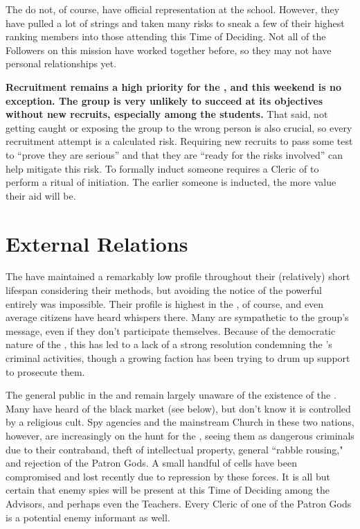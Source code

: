 \documentclass[blue]{GL2020}
\begin{document}
The \pGoaties{} do not, of course, have official representation at the school. However, they have pulled a lot of strings and taken many risks to sneak a few of their highest ranking members into those attending this Time of Deciding. Not all of the Followers on this mission have worked together before, so they may not have personal relationships yet.

\textbf{Recruitment remains a high priority for the \pGoaties{}, and this weekend is no exception. The group is very unlikely to succeed at its objectives without new recruits, especially among the students.} That said, not getting caught or exposing the group to the wrong person is also crucial, so every recruitment attempt is a calculated risk. Requiring new recruits to pass some test to ``prove they are serious'' and that they are ``ready for the risks involved'' can help mitigate this risk. To formally induct someone requires a Cleric of \cGenesis{} to perform a ritual of initiation. The earlier someone is inducted, the more value their aid will be.

\section*{External Relations}
The \pGoaties{} have maintained a remarkably low profile throughout their (relatively) short lifespan considering their methods, but avoiding the notice of the powerful entirely was impossible. Their profile is highest in the \pShip{}, of course, and even average citizens have heard whispers there. Many \pShippies{} are sympathetic to the group's message, even if they don't participate themselves. Because of the democratic nature of the \pShip{}, this has led to a lack of a strong resolution condemning the \pGoaties{}'s criminal activities, though a growing faction has been trying to drum up support to prosecute them.

The general public in the \pTech{} and \pFarm{} remain largely unaware of the existence of the \pGoaties{}. Many have heard of the black market (see below), but don’t know it is controlled by a religious cult. Spy agencies and the mainstream Church in these two nations, however, are increasingly on the hunt for the \pGoaties{}, seeing them as dangerous criminals due to their contraband, theft of intellectual property, general “rabble rousing," and rejection of the Patron Gods. A small handful of cells have been compromised and lost recently due to repression by these forces. It is all but certain that enemy spies will be present at this Time of Deciding among the Advisors, and perhaps even the Teachers. Every Cleric of one of the Patron Gods is a potential enemy informant as well.
\end{document}
